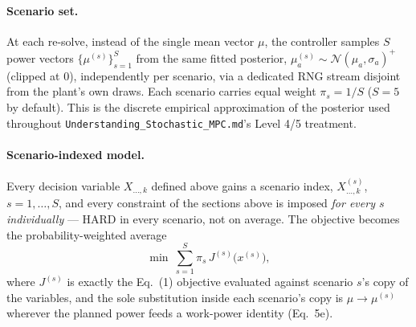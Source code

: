 \documentclass[11pt]{article}
\begin{document}
\paragraph{Scenario set.} At each re-solve, instead of the single mean vector $\mu$, the
controller samples $S$ power vectors $\{\mu^{(s)}\}_{s=1}^{S}$ from the same fitted posterior,
$\mu^{(s)}_a \sim \mathcal{N}(\mu_a,\sigma_a)^+$ (clipped at 0), independently per scenario,
via a dedicated RNG stream disjoint from the plant's own draws. Each scenario carries equal
weight $\pi_s = 1/S$ ($S=5$ by default). This is the discrete empirical approximation of the
posterior used throughout \texttt{Understanding\_Stochastic\_MPC.md}'s Level 4/5 treatment.

\paragraph{Scenario-indexed model.} Every decision variable $X_{\dots,k}$ defined above
gains a scenario index, $X_{\dots,k}^{(s)}$, $s=1,\dots,S$, and every constraint of
the sections above is imposed \emph{for every $s$ individually} — HARD in every
scenario, not on average. The objective becomes the probability-weighted average
\[
  \min \ \sum_{s=1}^{S} \pi_s \, J^{(s)}\bigl(x^{(s)}\bigr),
\]
where $J^{(s)}$ is exactly the Eq.~(1) objective evaluated against scenario $s$'s copy of the
variables, and the sole substitution inside each scenario's copy is $\mu \to \mu^{(s)}$
wherever the planned power feeds a work-power identity (Eq.~5e).
\end{document}
